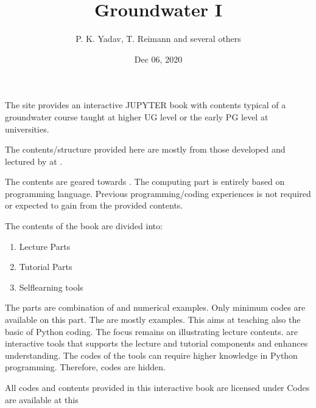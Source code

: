 \documentclass[letterpaper,10pt,english]{sphinxmanual}
\title{Groundwater I}
\date{Dec 06, 2020}
\author{P.\@{} K.\@{} Yadav, T.\@{} Reimann and several others}
\begin{document}
\pagestyle{empty}
\sphinxmaketitle
\pagestyle{plain}
\sphinxtableofcontents
\pagestyle{normal}
\label{\detokenize{intro::doc}}


The site provides an interactive JUPYTER book with contents typical of a  groundwater course taught at higher UG level or the early PG level at universities.

The contents/structure provided here are mostly from those developed and lectured by  at .

The contents are geared towards . The computing part is entirely based on  programming language. Previous programming/coding experiences is not required or expected to gain from the provided contents.

The contents of the book are divided into:
\begin{enumerate}
%
\item {} 
Lecture Parts

\item {} 
Tutorial Parts

\item {} 
Self\sphinxhyphen{}learning tools

\end{enumerate}

The  parts are combination of  and  numerical examples. Only minimum  codes are available on this part.
The  are mostly  examples. This aims at teaching also the basic of Python coding. The focus remains on illustrating lecture contents.  are interactive tools that supports the lecture and tutorial components and enhances understanding. The codes of the tools can require higher knowledge in Python programming. Therefore, codes are hidden.

All codes and contents provided in this interactive book are licensed under 
Codes are available at this 
\begin{quote}

\end{quote}
\end{document}
